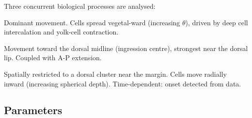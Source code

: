 \documentclass[11pt,a4paper]{article}
\begin{document}
\noindent Three concurrent biological processes are analysed:
\begin{description}[nosep,leftmargin=2cm]
  \item[Epiboly] Dominant movement.  Cells spread vegetal-ward (increasing
    $\theta$), driven by deep cell intercalation and yolk-cell contraction.
  \item[Convergence] Movement toward the dorsal midline (ingression centre),
    strongest near the dorsal lip.  Coupled with A-P extension.
  \item[Ingression] Spatially restricted to a dorsal cluster near the margin.
    Cells move radially inward (increasing spherical depth).
    Time-dependent: onset detected from data.
\end{description}


\subsection*{Parameters}
\label{tab:params}
\end{document}
